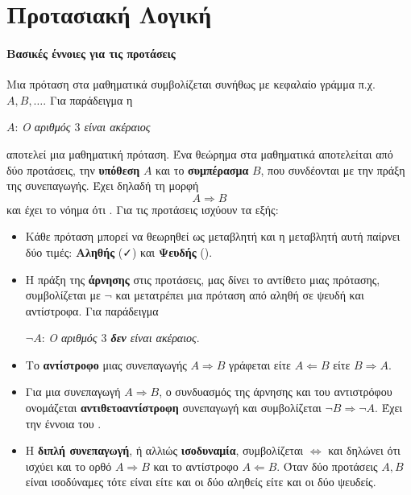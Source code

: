 \section{Προτασιακή Λογική}
\paragraph{Βασικές έννοιες για τις προτάσεις}
Μια πρόταση στα μαθηματικά συμβολίζεται συνήθως με κεφαλαίο γράμμα π.χ. $A,B,\ldots$. Για παράδειγμα η 
\begin{center}
$A$: \textit{Ο αριθμός $3$ είναι ακέραιος}
\end{center}
αποτελεί μια μαθηματική πρόταση. Ένα θεώρημα στα μαθηματικά αποτελείται από δύο προτάσεις, την \textbf{υπόθεση} $A$ και το \textbf{συμπέρασμα} $B$, που συνδέονται με την πράξη της συνεπαγωγής. Έχει δηλαδή τη μορφή
\[ A\Rightarrow B \]
και έχει το νόημα ότι . Για τις προτάσεις ισχύουν τα εξής:
\begin{itemize}
\item Κάθε πρόταση μπορεί να θεωρηθεί ως μεταβλητή και η μεταβλητή αυτή παίρνει δύο τιμές: \textbf{Αληθής} (\textcolor{check}{\faCheck}) και \textbf{Ψευδής} (\textcolor{error}{\faTimes}).
\item Η πράξη της \textbf{άρνησης} στις προτάσεις, μας δίνει το αντίθετο μιας πρότασης, συμβολίζεται με $\neg$ και μετατρέπει μια πρόταση από αληθή σε ψευδή και αντίστροφα. Για παράδειγμα 
\begin{center}
$\neg A$: \textit{Ο αριθμός $3$ \textbf{δεν} είναι ακέραιος}.
\end{center}
\item Το \textbf{αντίστροφο} μιας συνεπαγωγής $A\Rightarrow B$ γράφεται είτε $A\Leftarrow B$ είτε $B\Rightarrow A$.
\item Για μια συνεπαγωγή $A\Rightarrow B$, ο συνδυασμός της άρνησης και του αντιστρόφου ονομάζεται \textbf{αντιθετοαντίστροφη} συνεπαγωγή και συμβολίζεται $\neg B\Rightarrow\neg A$. Έχει την έννοια του .
\item Η \textbf{διπλή συνεπαγωγή}, ή αλλιώς \textbf{ισοδυναμία}, συμβολίζεται $\Leftrightarrow$ και δηλώνει ότι ισχύει και το ορθό $A\Rightarrow B$ και το αντίστροφο $A\Leftarrow B$. Όταν δύο προτάσεις $A,B$ είναι ισοδύναμες τότε είναι είτε και οι δύο αληθείς είτε και οι δύο ψευδείς.
\end{itemize}
